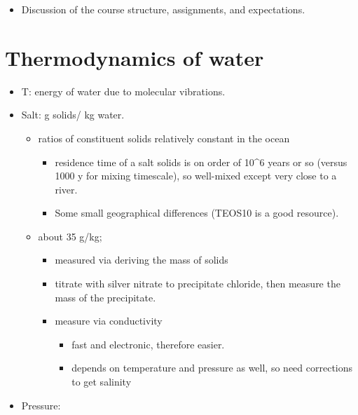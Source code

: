 \begin{itemize}
\tightlist
\item
  Discussion of the course structure, assignments, and expectations.
\end{itemize}

\section{Thermodynamics of water}\label{thermodynamics-of-water}

\begin{itemize}
\tightlist
\item
  T: energy of water due to molecular vibrations.
\item
  Salt: g solids/ kg water.

  \begin{itemize}
  \tightlist
  \item
    ratios of constituent solids relatively constant in the ocean

    \begin{itemize}
    \tightlist
    \item
      residence time of a salt solids is on order of 10\^{}6 years or so
      (versus 1000 y for mixing timescale), so well-mixed except very
      close to a river.
    \item
      Some small geographical differences (TEOS10 is a good resource).
    \end{itemize}
  \item
    about 35 g/kg;

    \begin{itemize}
    \tightlist
    \item
      measured via deriving the mass of solids
    \item
      titrate with silver nitrate to precipitate chloride, then measure
      the mass of the precipitate.
    \item
      measure via conductivity

      \begin{itemize}
      \tightlist
      \item
        fast and electronic, therefore easier.
      \item
        depends on temperature and pressure as well, so need corrections
        to get salinity
      \end{itemize}
    \end{itemize}
  \end{itemize}
\item
  Pressure:


\end{itemize}

